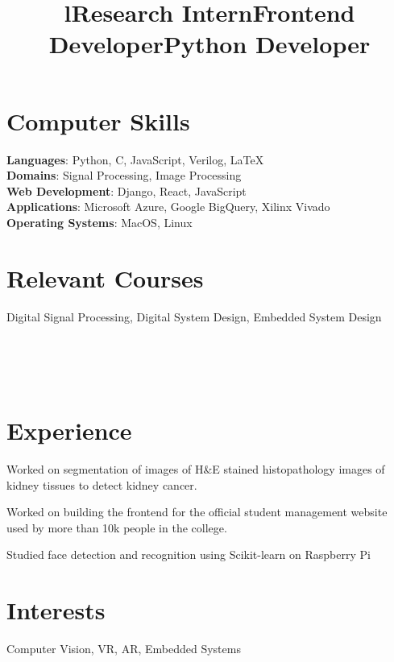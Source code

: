 \documentclass[margin]{res}
\begin{document}
\begin{resume}
    \section{Computer Skills}
      \textbf{Languages}: Python, C, JavaScript, Verilog, \LaTeX
      \\
      \textbf{Domains}: Signal Processing, Image Processing
      \\
      \textbf{Web Development}: Django, React, JavaScript
      \\
      \textbf{Applications}: Microsoft Azure, Google BigQuery, Xilinx Vivado
      \\
      \textbf{Operating Systems}: MacOS, Linux

    \section{Relevant Courses}
      Digital Signal Processing, Digital System Design, Embedded System Design

    \begin{format}
      \title{l}\\
      \\
      \body\\
    \end{format}

    \section{Experience}
      \title{\textbf{Research Intern}}
      \begin{position}
        Worked on segmentation of images of H\&E stained histopathology images of kidney tissues to detect kidney cancer.
      \end{position}

      \title{\textbf{Frontend Developer}}
      \begin{position}
        Worked on building the frontend for the official student management website used by more than 10k people in the college.
      \end{position}

      \title{\textbf{Python Developer}}
      \begin{position}
        Studied face detection and recognition using Scikit-learn on Raspberry Pi
      \end{position}

    \section{Interests}
      Computer Vision, VR, AR, Embedded Systems
  \end{resume}
\end{document}

